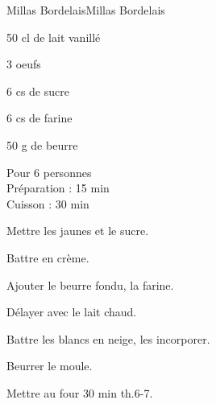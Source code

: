 \begin{recette}{Millas Bordelais}{Millas Bordelais}

\begin{ingredients}
50 cl de lait vanillé\par
3 oeufs\par
6 cs de sucre\par
6 cs de farine\par
50 g de beurre\par
\end{ingredients}

\begin{infos}
Pour 6 personnes\\
Préparation : 15 min\\
Cuisson : 30 min\\
\end{infos}

\begin{etapes}
\item Mettre les jaunes et le sucre.
\item Battre en crème.
\item Ajouter le beurre fondu, la farine.
\item Délayer avec le lait chaud.
\item Battre les blancs en neige, les incorporer.
\item Beurrer le moule.
\item Mettre au four 30 min th.6-7.
\end{etapes}

\end{recette}